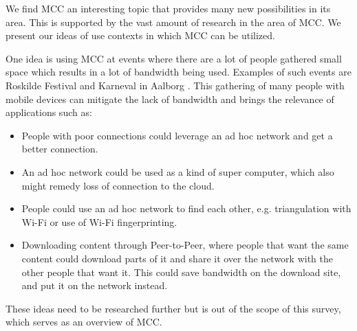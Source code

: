 We find MCC an interesting topic that provides many new possibilities in its area.
This is supported by the vast amount of research in the area of MCC.
We present our ideas of use contexts in which MCC can be utilized.

One idea is using MCC at events where there are a lot of people gathered small space which results in a lot of bandwidth being used.
Examples of such events are Roskilde Festival \citep{misc:roskilde} and Karneval in Aalborg \citep{misc:karneval}.
This gathering of many people with mobile devices can mitigate the lack of bandwidth and brings the relevance of applications such as:

\begin{itemize}
	\item People with poor connections could leverage an ad hoc network and get a better connection.
	\item An ad hoc network could be used as a kind of super computer, which also might remedy loss of connection to the cloud.
	\item People could use an ad hoc network to find each other, e.g. triangulation with Wi-Fi or use of Wi-Fi fingerprinting. 
	\item Downloading content through Peer-to-Peer, where people that want the same content could download parts of it and share it over the network with the other people that want it. This could save bandwidth on the download site, and put it on the network instead.
\end{itemize}

These ideas need to be researched further but is out of the scope of this survey, which serves as an overview of MCC. 
